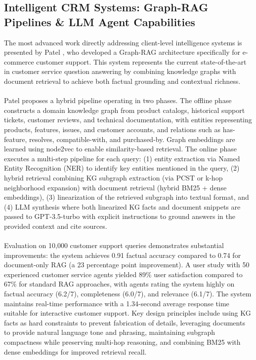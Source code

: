 \subsection{Intelligent CRM Systems: Graph-RAG Pipelines \& LLM Agent Capabilities}
The most advanced work directly addressing client-level intelligence systems is presented by Patel \cite{patel2025graphRAG}, who developed a Graph-RAG architecture specifically for e-commerce customer support. This system represents the current state-of-the-art in customer service question answering by combining knowledge graphs with document retrieval to achieve both factual grounding and contextual richness.
\\\\
Patel proposes a hybrid pipeline operating in two phases. The offline phase constructs a domain knowledge graph from product catalogs, historical support tickets, customer reviews, and technical documentation, with entities representing products, features, issues, and customer accounts, and relations such as has-feature, resolves, compatible-with, and purchased-by. Graph embeddings are learned using node2vec to enable similarity-based retrieval. The online phase executes a multi-step pipeline for each query: (1) entity extraction via Named Entity Recognition (NER) to identify key entities mentioned in the query, (2) hybrid retrieval combining KG subgraph extraction (via PCST or k-hop neighborhood expansion) with document retrieval (hybrid BM25 + dense embeddings), (3) linearization of the retrieved subgraph into textual format, and (4) LLM synthesis where both linearized KG facts and document snippets are passed to GPT-3.5-turbo with explicit instructions to ground answers in the provided context and cite sources.
\\\\
Evaluation on 10,000 customer support queries demonstrates substantial improvements: the system achieves 0.91 factual accuracy compared to 0.74 for document-only RAG (a 23 percentage point improvement). A user study with 50 experienced customer service agents yielded 89\% user satisfaction compared to 67\% for standard RAG approaches, with agents rating the system highly on factual accuracy (6.2/7), completeness (6.0/7), and relevance (6.1/7). The system maintains real-time performance with a 1.34-second average response time suitable for interactive customer support. Key design principles include using KG facts as hard constraints to prevent fabrication of details, leveraging documents to provide natural language tone and phrasing, maintaining subgraph compactness while preserving multi-hop reasoning, and combining BM25 with dense embeddings for improved retrieval recall.
